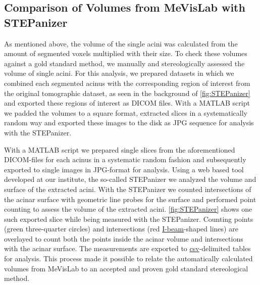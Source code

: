 \documentclass[%
	paper=a4,%
	DIV=calc,%
	twoside=true,%
	abstract=true,%
	]{scrartcl}
\begin{document}
\subsection{Comparison of Volumes from MeVisLab with STEPanizer}
As mentioned above, the volume of the single acini was calculated from the amount of segmented voxels multiplied with their size. To check these volumes against a gold standard method, we manually and stereologically assessed the volume of single acini. For this analysis, we prepared datasets in which we combined each segmented acinus with the corresponding region of interest from the original tomographic dataset, as seen in the background of \autoref{fig:STEPanizer} and exported these regions of interest as DICOM files. With a MATLAB script we padded the volumes to a square format, extracted slices in a systematically random way and exported these images to the disk as JPG sequence for analysis with the STEPanizer. 


With a MATLAB script we prepared single slices from the aforementioned DICOM-files for each acinus in a systematic random fashion and subsequently exported to single images in JPG-format for analysis. Using a web based tool developed at our institute, the so-called STEPanizer \cite[provided free of charge at \url{http://stepanizer.com}]{Tschanz2011} we analyzed the volume and surface of the extracted acini. With the STEPanizer we counted intersections of the  acinar surface with geometric line probes for the surface and performed point counting to assess the volume of the extracted acini. \autoref{fig:STEPanizer} shows one such exported slice while being measured with the STEPanizer. Counting points (green three-quarter circles) and intersections (red \href{http://www.dict.cc/englisch-deutsch/I-beam.html}{I-beam}-shaped lines) are overlayed to count both the points inside the acinar volume and intersections with the acinar surface. The measurements are exported to \href{https://secure.wikimedia.org/wikipedia/en/w/index.php?title=Comma-separated_values&oldid=441921632}{csv}-delimited tables for analysis. This process made it possible to relate the automatically calculated volumes from MeVisLab to an accepted and proven gold standard stereological method.
\end{document}
